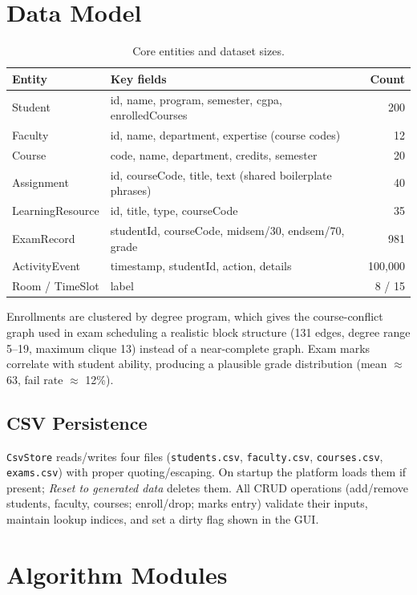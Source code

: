 \documentclass[11pt,a4paper]{article}
\begin{document}
\section{Data Model}

\begin{table}[H]
\centering
\begin{tabular}{llr}
\toprule
Entity & Key fields & Count \\
\midrule
Student & id, name, program, semester, cgpa, enrolledCourses & 200 \\
Faculty & id, name, department, expertise (course codes) & 12 \\
Course & code, name, department, credits, semester & 20 \\
Assignment & id, courseCode, title, text (shared boilerplate phrases) & 40 \\
LearningResource & id, title, type, courseCode & 35 \\
ExamRecord & studentId, courseCode, midsem/30, endsem/70, grade & 981 \\
ActivityEvent & timestamp, studentId, action, details & 100{,}000 \\
Room / TimeSlot & label & 8 / 15 \\
\bottomrule
\end{tabular}
\caption{Core entities and dataset sizes.}
\end{table}

Enrollments are clustered by degree program, which gives the course-conflict graph used
in exam scheduling a realistic block structure (131 edges, degree range 5--19, maximum
clique 13) instead of a near-complete graph. Exam marks correlate with student ability,
producing a plausible grade distribution (mean $\approx$ 63, fail rate $\approx$ 12\%).

\subsection{CSV Persistence}
\texttt{CsvStore} reads/writes four files (\texttt{students.csv}, \texttt{faculty.csv},
\texttt{courses.csv}, \texttt{exams.csv}) with proper quoting/escaping. On startup the
platform loads them if present; \emph{Reset to generated data} deletes them. All CRUD
operations (add/remove students, faculty, courses; enroll/drop; marks entry) validate
their inputs, maintain lookup indices, and set a dirty flag shown in the GUI.

\section{Algorithm Modules}
\end{document}
